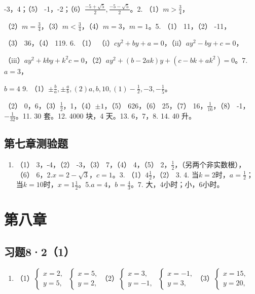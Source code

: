 -3，4；（5）
-1，-2；（6）\(\frac{-5 + \sqrt{5}}{2}, \frac{-5 - \sqrt{5}}{2}\)。2.
（1）\(m > \frac{3}{4}\)，

（2）\(m = \frac{3}{4}\)，（3）\(m < \frac{3}{4}\)，（4）\(m = 3\)，\(m = 1\)。5.
（1） 11，（2） -11，

（3） 36，（4） 119. 6. （1）
（i）\(cy^2 + by + a = 0\)，（ii）\(ay^2 - by + c = 0\)，

（iii）\(ay^2 + kby + k^2c = 0\)，（2）\(ay^2 + (b - 2ak)y + (c - bk + ak^2) = 0\)。7.\(a = 3\)，

\(b = 4\) 9.
（1）\(\pm \frac{b}{a}, \pm \frac{a}{b}, (2)a, b, 10, (1) - \frac{1}{2}, -3, -\frac{1}{5}\)。

（2） 0，6，（3）\(\frac{1}{2}\)，1，（4）\(\pm 1\)，（5） 626，（6）
25，（7） 16，\(\frac{1}{16}\)，（8） -1，\(-\frac{1}{32}\)。11. 30
套。12. 4000 块，4 天。13. 6，7，8. 14. 40 升。

\subsection{第七章测验题}

\begin{enumerate}
\item
  （1） 3，-4，（2） -3，（3） 7，（4） 4，（5）
  2，\(\frac{1}{2}\)，（另两个非实数根），（6）
  6，2.\(x = 2 - \sqrt{3}\)，\(c = 1\)。3. （1）\(4\frac{1}{2}\)，（2）
  3. 4.
  当\(k = 2\)时，\(a = \frac{1}{2}\)；当\(k = 10\)时，\(x = 1\frac{1}{2}\)。5.\(a = 4\)，\(b = \frac{4}{3}\)。7.
  大，4小时；小，6小时。
\end{enumerate}

\section{第八章}

\subsection{习题8·2（1）}

\begin{enumerate}[start=3]
\item
  （1）\(\left\{ \begin{array}{l} x = 2, \\ y = 5, \end{array} \right.\) \(\left\{ \begin{array}{l} x = 5, \\ y = 2, \end{array} \right.\)（2）\(\left\{ \begin{array}{l} x = 3, \\ y = -1, \end{array} \right.\) \(\left\{ \begin{array}{l} x = -1, \\ y = 3, \end{array} \right.\)（3）\(\left\{ \begin{array}{l} x = 15, \\ y = 20, \end{array} \right.\)
\end{enumerate}

